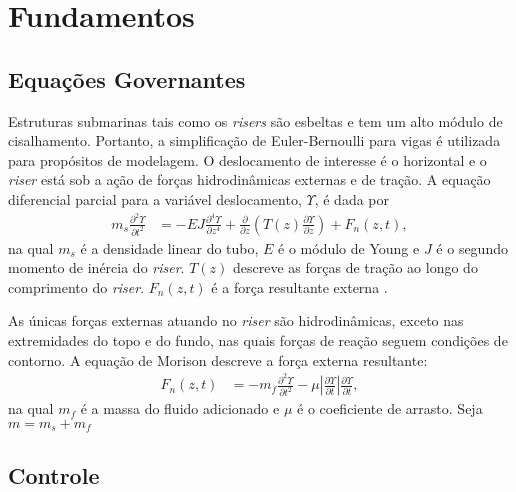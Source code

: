 \chapter{Fundamentos\label{chap:FundamentacaoMatematica}}


\section{Equações Governantes}

Estruturas submarinas tais como os \textit{risers} são esbeltas e tem um alto módulo de cisalhamento. Portanto, a simplificação de Euler-Bernoulli para vigas é utilizada para propósitos de modelagem. O deslocamento de interesse é o horizontal e o \textit{riser} está sob a ação de forças hidrodinâmicas externas e de tração. A equação diferencial parcial para a variável deslocamento, $\Upsilon$, é dada por \begin{align}
	m_s \frac{\partial^2 \Upsilon}{\partial t^2} &= -E J	\frac{\partial^4 \Upsilon}{\partial z^4} + \frac{\partial}{\partial z}\left(T(z) \frac{\partial \Upsilon}{\partial z}\right) + F_n(z,t),
\end{align} na qual $m_s$ é a densidade linear do tubo, $E$ é o módulo de Young e $J$ é o segundo momento de inércia do \textit{riser}. $T(z)$ descreve as forças de tração ao longo do comprimento do \textit{riser}. $F_n(z,t)$ é a força resultante externa \cite{fabricioIFAC}.

As únicas forças externas atuando no \textit{riser} são hidrodinâmicas, exceto nas extremidades do topo e do fundo, nas quais forças de reação seguem condições de contorno. A equação de Morison descreve a força externa resultante: \begin{align}
	F_n(z,t) &= -m_f \frac{\partial^2 \Upsilon}{\partial t^2} - \mu\left|\frac{\partial \Upsilon}{\partial t}\right|\frac{\partial \Upsilon}{\partial t},
\end{align} na qual $m_f$ é a massa do fluido adicionado e $\mu$ é o coeficiente de arrasto. Seja $m = m_s + m_f$ 

\section{Controle}
